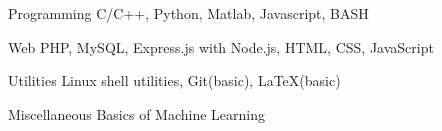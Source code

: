 \begin{cvskills}

  \cvskill
  {Programming}
  {C/C++, Python, Matlab, Javascript, BASH}

  \cvskill
  {Web}
  {PHP, MySQL, Express.js with Node.js, HTML, CSS, JavaScript}

  \cvskill
  {Utilities}
  {Linux shell utilities, Git(basic), \LaTeX(basic) }

  \cvskill
  {Miscellaneous}
  {Basics of Machine Learning}

\end{cvskills}

